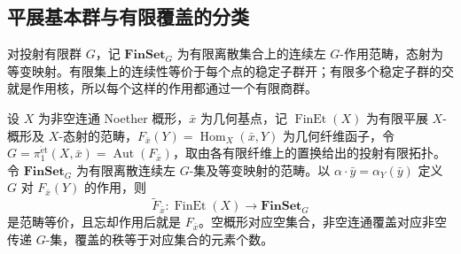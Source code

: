 \subsection{平展基本群与有限覆盖的分类}
\label{b3:subsec:I02:02}

对投射有限群 \(G\)，记 \(\mathbf{FinSet}_G\) 为有限离散集合上的连续左 \(G\)-作用范畴，态射为等变映射。有限集上的连续性等价于每个点的稳定子群开；有限多个稳定子群的交就是作用核，所以每个这样的作用都通过一个有限商群。

\begin{theorem}[有限平展覆盖的分类]\label{b3:thm:I-galois-classification}
	设 \(X\) 为非空连通 Noether 概形，\(\bar x\) 为几何基点，记 \(\operatorname{FinEt}(X)\) 为有限平展 \(X\)-概形及 \(X\)-态射的范畴，\(F_{\bar x}(Y)=\operatorname{Hom}_X(\bar x,Y)\) 为几何纤维函子，令 \(G=\pi_1^{\mathrm{\acute et}}(X,\bar x)=\operatorname{Aut}(F_{\bar x})\)，取由各有限纤维上的置换给出的投射有限拓扑。令 \(\mathbf{FinSet}_G\) 为有限离散连续左 \(G\)-集及等变映射的范畴。以 \(\alpha\cdot\bar y=\alpha_Y(\bar y)\) 定义 \(G\) 对 \(F_{\bar x}(Y)\) 的作用，则
	\[
		\widetilde F_{\bar x}:\operatorname{FinEt}(X)
		\longrightarrow\mathbf{FinSet}_G
	\]
	是范畴等价，且忘却作用后就是 \(F_{\bar x}\)。空概形对应空集合，非空连通覆盖对应非空传递 \(G\)-集，覆盖的秩等于对应集合的元素个数。
\end{theorem}
